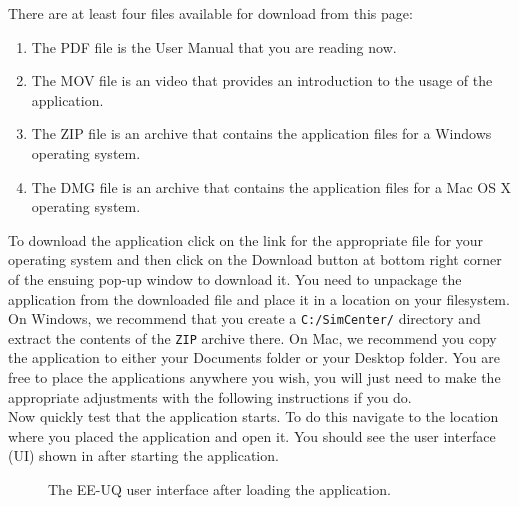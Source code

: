
There are at least four files available for download from this page: 
\begin{enumerate}
    \item The PDF file is the User Manual that you are reading now.
    \item The MOV file is an video that provides an introduction to the usage of the application.
    \item The ZIP file is an archive that contains the application files for a Windows operating system.
    \item The DMG file is an archive that contains the application files for a Mac OS X operating system.
\end{enumerate}

To download the \texttt{\getsoftwarename{}} application click on the link for
the appropriate file for your operating system and then click on the
Download button at bottom right corner of the ensuing pop-up window to
download it. You need to unpackage the application from the downloaded
file and place it in a location on your filesystem. On Windows, we
recommend that you create a \texttt{C:/SimCenter/\getsoftwarename{}}
directory and extract the contents of the \texttt{ZIP} archive
there. On Mac, we recommend you copy the application to either your
Documents folder or your Desktop folder. You are free to place the
applications anywhere you wish, you will just need to make the
appropriate adjustments with the following instructions if you do. \\

Now quickly test that the application starts. To do this navigate to
the location where you placed the application and open it. You should
see the user interface (UI) shown in  after
starting the application.\\

\begin{figure}[!htbp]
  \caption{The EE-UQ user interface after loading the application.}
  \label{fig:app_UI}
\end{figure}

